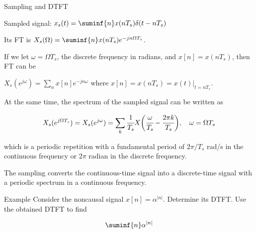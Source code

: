 \documentclass[aspectratio=169,xcolor=dvipsnames,svgnames,x11names,fleqn]{beamer}
\begin{document}
\begin{frame}{Sampling and DTFT}

\small 
    Sampled signal:  $x_s(t) = \suminf{n} x(nT_s) \delta(t-nT_s)$
    
\vspace{5pt}
    
    Its FT is $X_s(\Omega) = \suminf{n} x(nT_s) e^{-jn\Omega T_s }$.

\vspace{5pt}

    If we let $\omega = \Omega T_s$, the discrete frequency in radians, and $x[n] = x(nT_s)$, then FT can be 

\vspace{5pt}

    $X_s(e^{j\omega}) = \sum_n x[n] e^{-jn \omega}$
    where $x[n] = x(nT_s) = x(t)\bigg|_{t = nT_s}$.

    \vspace{5pt}

At the same time, the spectrum of the sampled signal can be written as

$$
X_s(e^{j\Omega T_s}) = X_s(e^{j\omega})  = \sum_{k} \cfrac{1}{T_s}X\bigg( \cfrac{\omega}{T_s} - \cfrac{2\pi k}{T_s} \bigg), \quad \omega = \Omega T_s
$$

which is a periodic repetition with a fundamental period of $2\pi / T_s$ rad/s in the continuous frequency or $2\pi$ radian in the discrete frequency.

The sampling converts the continuous-time signal into a discrete-time signal with a periodic spectrum in a continuous frequency.


\end{frame}



\begin{frame}{Example}
Consider the noncausal signal $x[n]  = \alpha^{|n|}$. Determine its DTFT. Use the obtained DTFT to find 

$$
\suminf{n} \alpha^{|n|}
$$
    
\end{frame}
\end{document}

